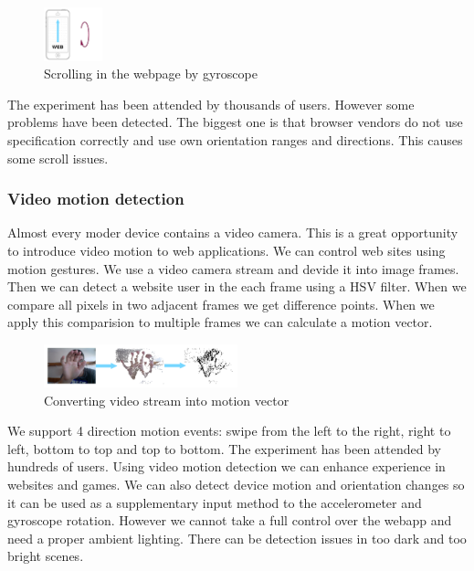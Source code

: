 \documentclass{iitsrc}
\begin{document}
\begin{figure}[ht]
    \begin{center}
        \includegraphics[width=0.15\textwidth]{../images/gyroscope}
        \caption{Scrolling in the webpage by gyroscope}
        \label{fig:gyroscope}
    \end{center}
\end{figure}

\noindent The experiment has been attended by thousands of users. However some problems have been detected. The biggest one is that browser vendors do not use specification correctly and use own orientation ranges and directions. This causes some scroll issues.


\subsubsection{Video motion detection} %
\label{ssub:video_camera_motion}

Almost every moder device contains a video camera. This is a great opportunity to introduce video motion to web applications. We can control web sites using motion gestures. We use a video camera stream and devide it into image frames. Then we can detect a website user in the each frame using a HSV filter. When we compare all pixels in two adjacent frames we get difference points. When we apply this comparision to multiple frames we can calculate a motion vector.

\begin{figure}[ht]
    \begin{center}
        \includegraphics[width=0.5\textwidth]{../images/videomotion}
        \caption{Converting video stream into motion vector}
        \label{fig:videomotion}
    \end{center}
\end{figure}

\noindent We support 4 direction motion events: swipe from the left to the right, right to left, bottom to top and top to bottom. The experiment has been attended by hundreds of users. Using video motion detection we can enhance experience in websites and games. We can also detect device motion and orientation changes so it can be used as a supplementary input method to the accelerometer and gyroscope rotation. However we cannot take a full control over the webapp and need a proper ambient lighting. There can be detection issues in too dark and too bright scenes.
\end{document}
